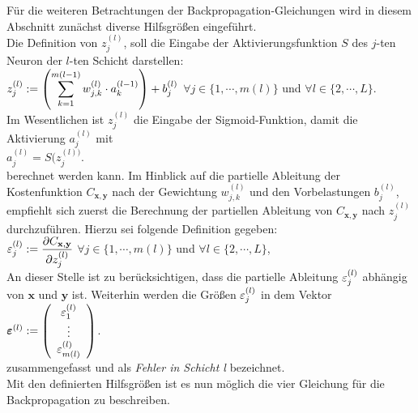 \noindent
Für die weiteren Betrachtungen der Backpropagation-Gleichungen wird in diesem Abschnitt zunächst diverse Hilfsgrößen eingeführt. \\
Die Definition von $z_j^{(l)}$, soll die Eingabe der Aktivierungsfunktion $S$ des $j$-ten Neuron der $l$-ten Schicht darstellen:
\\[0.2cm]
\hspace*{1.3cm}
$\displaystyle z_j^{(l)} := \left(\sum\limits_{k=1}^{m(l-1)}  w_{j,k}^{(l)} \cdot a_k^{(l-1)}\right) + b_j^{(l)}$
\quad $\forall j \in \{1, \cdots, m(l)\}$ und $\forall l \in \{2,\cdots,L\}$.
\\[0.2cm]
Im Wesentlichen ist $z_j^{(l)}$ die Eingabe der Sigmoid-Funktion, damit die Aktivierung $a_j^{(l)}$ mit
\\[0.2cm]
\hspace*{1.3cm}
$a_j^{(l)} = S(z_j^{(l))}$.
\\[0.2cm]
berechnet werden kann. Im Hinblick auf die partielle Ableitung der Kostenfunktion $C_{\mathbf{x},\mathbf{y}}$ nach der Gewichtung $w_{j,k}^{(l)}$ und den Vorbelastungen $b_j^{(l)}$, empfiehlt sich zuerst die Berechnung der partiellen Ableitung von $C_{\mathbf{x},\mathbf{y}}$ nach $z_j^{(l)}$ durchzuführen. Hierzu sei folgende Definition gegeben:
\\[0.2cm]
\hspace*{1.3cm}
$\displaystyle\varepsilon_j^{(l)} := \frac{\partial C_{\mathbf{x}, \mathbf{y}}}{\partial z_j^{(l)}}$ \quad $\forall j \in \{1, \cdots, m(l)\}$ und $\forall l \in \{2,\cdots, L\}$,
\\[0.2cm]
An dieser Stelle ist zu berücksichtigen, dass die partielle Ableitung $\displaystyle\varepsilon_j^{(l)}$ abhängig von $\mathbf{x}$ und $\mathbf{y}$ ist. Weiterhin werden die Größen $\displaystyle\varepsilon_j^{(l)}$ in dem Vektor
\\[0.2cm]
\hspace*{1.3cm}
$\boldsymbol{\varepsilon}^{(l)} := \left(
  \begin{array}[c]{c}
    \varepsilon_1^{(l)}      \\
    \vdots             \\
    \varepsilon_{m(l)}^{(l)}  
  \end{array}
  \right)
$.
\\[0.2cm]
zusammengefasst und als \textit{Fehler in Schicht l} bezeichnet. \\

\noindent
Mit den definierten Hilfsgrößen ist es nun möglich die vier Gleichung für die Backpropagation zu beschreiben. 


